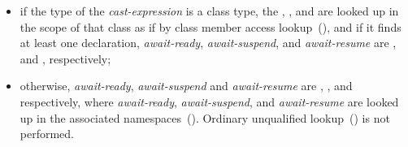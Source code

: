 \begin{itemize}
	\item if the type of the \textit{cast-expression} is a class type, the 
	, , and  are 
	looked up in the scope of that class
	as if by class member access lookup~(), and if it finds at least one declaration, 
	\textit{await-ready}, \textit{await-suspend}, and \textit{await-resume} are
	,  and ,
	respectively;
	
	\item otherwise, \textit{await-ready}, \textit{await-suspend} and \textit{await-resume} are 
	, , and  
	respectively, where 
	\textit{await-ready}, \textit{await-suspend}, and \textit{await-resume} are 
	looked up in the associated namespaces~().
	\enternote Ordinary unqualified lookup~() is not
	performed. \exitnote
\end{itemize}

